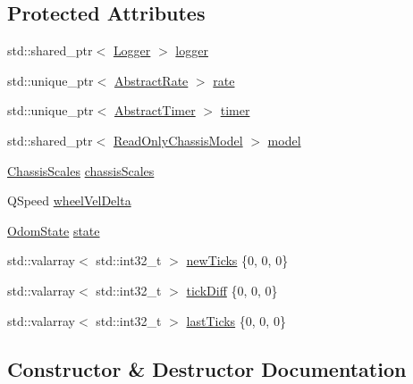 \subsection*{Protected Attributes}
\begin{DoxyCompactItemize}
\item 
std\+::shared\+\_\+ptr$<$ \mbox{\hyperlink{classokapi_1_1Logger}{Logger}} $>$ \mbox{\hyperlink{classokapi_1_1Odometry_a30cfb095d16b4a32b471568a40ab4711}{logger}}
\item 
std\+::unique\+\_\+ptr$<$ \mbox{\hyperlink{classokapi_1_1AbstractRate}{Abstract\+Rate}} $>$ \mbox{\hyperlink{classokapi_1_1Odometry_a51a3a499e443240742ae8d3272be2110}{rate}}
\item 
std\+::unique\+\_\+ptr$<$ \mbox{\hyperlink{classokapi_1_1AbstractTimer}{Abstract\+Timer}} $>$ \mbox{\hyperlink{classokapi_1_1Odometry_aedf3fb84bba92fbaf2fc9dfe8d91fd20}{timer}}
\item 
std\+::shared\+\_\+ptr$<$ \mbox{\hyperlink{classokapi_1_1ReadOnlyChassisModel}{Read\+Only\+Chassis\+Model}} $>$ \mbox{\hyperlink{classokapi_1_1Odometry_a71fc47e8d90c6d6728a0a5163319d2ed}{model}}
\item 
\mbox{\hyperlink{classokapi_1_1ChassisScales}{Chassis\+Scales}} \mbox{\hyperlink{classokapi_1_1Odometry_afb1605502a0164b1e946a15ae585ace0}{chassis\+Scales}}
\item 
Q\+Speed \mbox{\hyperlink{classokapi_1_1Odometry_acebfb2e25552de9062dd824fcccfb50e}{wheel\+Vel\+Delta}}
\item 
\mbox{\hyperlink{structokapi_1_1OdomState}{Odom\+State}} \mbox{\hyperlink{classokapi_1_1Odometry_a63165b62b596c34c1965f674f57aae5f}{state}}
\item 
std\+::valarray$<$ std\+::int32\+\_\+t $>$ \mbox{\hyperlink{classokapi_1_1Odometry_aabbd64b0c4969953599f694c71eb1a7f}{new\+Ticks}} \{0, 0, 0\}
\item 
std\+::valarray$<$ std\+::int32\+\_\+t $>$ \mbox{\hyperlink{classokapi_1_1Odometry_a28be79e0e646d4dcfc831896c61d81fc}{tick\+Diff}} \{0, 0, 0\}
\item 
std\+::valarray$<$ std\+::int32\+\_\+t $>$ \mbox{\hyperlink{classokapi_1_1Odometry_a7431f21a4bc30c9812f45e4f9d560cfa}{last\+Ticks}} \{0, 0, 0\}
\end{DoxyCompactItemize}


\subsection{Constructor \& Destructor Documentation}
\mbox{\label{classokapi_1_1Odometry_a495d43ceb8cc03513e8365fdc1b37974}} 
